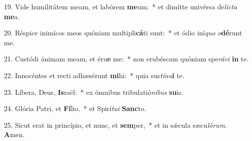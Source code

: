 19. Vide humilitátem meam, et labórem \textbf{me}um:~*  et dimítte univérsa de\textit{líc}\textit{ta} \textbf{me}a.\

20. Réspice inimícos meos quóniam multipli\textbf{cá}ti sunt:~*  et ódio iní\textit{quo} \textit{o}\textbf{dé}runt me.\

21. Custódi ánimam meam, et éru\textbf{e} me:~*  non erubéscam quóniam spe\textit{rá}\textit{vi} \textbf{in} te.\

22. Innocéntes et recti adhæsérunt \textbf{mi}hi:~*  quia sus\textit{tí}\textit{nu}\textbf{i} te.\

23. Líbera, Deus, \textbf{Is}raël:~*  ex ómnibus tribulatió\textit{ni}\textit{bus} \textbf{su}is.\

24. Glória Patri, et \textbf{Fí}lio,~*  et Spirí\textit{tu}\textit{i} \textbf{Sanc}to.\

25. Sicut erat in princípio, et nunc, et \textbf{sem}per,~*  et in sǽcula sæcu\textit{ló}\textit{rum}. \textbf{A}men.\

